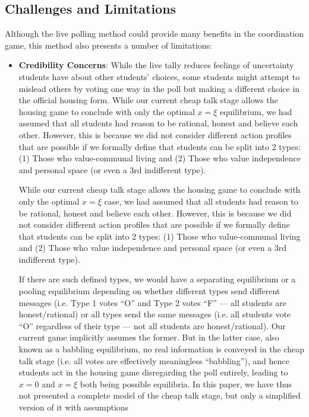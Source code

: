 \documentclass[12pt]{article}
\begin{document}
\subsection{Challenges and Limitations}
Although the live polling method could provide many benefits in the coordination game, this method also presents a number of limitations:
\begin{itemize}
    \item \textbf{Credibility Concerns}: While the live tally reduces feelings of uncertainty students have about other students’ choices, some students might attempt to mislead others by voting one way in the poll but making a different choice in the official housing form. 
    While our current cheap talk stage allows the housing game to conclude with only the optimal $x=\xi$ equilibrium, we had assumed that all students had reason to be rational, honest and believe each other. However, this is because we did not consider different action profiles that are possible if we formally define that students can be split into 2 types: (1) Those who value-communal living and (2) Those who value independence and personal space (or even a 3rd indifferent type).

    While our current cheap talk stage allows the housing game to conclude with only the optimal $x = \xi$ case, we had assumed that all students had reason to be rational, honest and believe each other. However, this is because we did not consider different action profiles that are possible if we formally define that students can be split into 2 types: (1) Those who value-communal living and (2) Those who value independence and personal space (or even a 3rd indifferent type).

    If there are such defined types, we would have a separating equilibrium or a pooling equilibrium depending on whether different types send different messages (i.e. Type 1 votes “O” and Type 2 votes “F” — all students are honest/rational) or all types send the same messages (i.e. all students vote “O” regardless of their type — not all students are honest/rational). Our current game implicitly assumes the former. But in the latter case, also known as a babbling equilibrium, no real information is conveyed in the cheap talk stage (i.e. all votes are effectively meaningless “babbling”), and hence students act in the housing game disregarding the poll entirely, leading to $x=0$ and $x=\xi$ both being possible equilibria. In this paper, we have thus not presented a complete model of the cheap talk stage, but only a simplified version of it with assumptions
\end{itemize}
\end{document}
